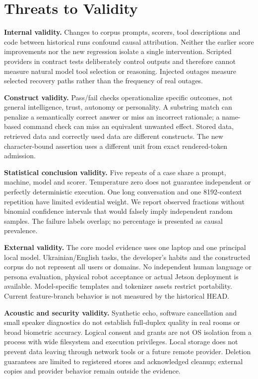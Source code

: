 \documentclass[11pt,a4paper]{article}
\begin{document}
\section{Threats to Validity}\label{sec:validity}
\textbf{Internal validity.} Changes to corpus prompts, scorers, tool descriptions and code between historical runs confound causal attribution. Neither the earlier score improvements nor the new regression isolate a single intervention. Scripted providers in contract tests deliberately control outputs and therefore cannot measure natural model tool selection or reasoning. Injected outages measure selected recovery paths rather than the frequency of real outages.

\textbf{Construct validity.} Pass/fail checks operationalize specific outcomes, not general intelligence, trust, autonomy or personality. A substring match can penalize a semantically correct answer or miss an incorrect rationale; a name-based command check can miss an equivalent unwanted effect. Stored data, retrieved data and correctly used data are different constructs. The new character-bound assertion uses a different unit from exact rendered-token admission.

\textbf{Statistical conclusion validity.} Five repeats of a case share a prompt, machine, model and scorer. Temperature zero does not guarantee independent or perfectly deterministic execution. One long conversation and one 8192-context repetition have limited evidential weight. We report observed fractions without binomial confidence intervals that would falsely imply independent random samples. The failure labels overlap; no percentage is presented as causal prevalence.

\textbf{External validity.} The core model evidence uses one laptop and one principal local model. Ukrainian/English tasks, the developer's habits and the constructed corpus do not represent all users or domains. No independent human language or persona evaluation, physical robot acceptance or actual Jetson deployment is available. Model-specific templates and tokenizer assets restrict portability. Current feature-branch behavior is not measured by the historical HEAD.

\textbf{Acoustic and security validity.} Synthetic echo, software cancellation and small speaker diagnostics do not establish full-duplex quality in real rooms or broad biometric accuracy. Logical consent and grants are not OS isolation from a process with wide filesystem and execution privileges. Local storage does not prevent data leaving through network tools or a future remote provider. Deletion guarantees are limited to registered stores and acknowledged cleanup; external copies and provider behavior remain outside the evidence.
\end{document}

